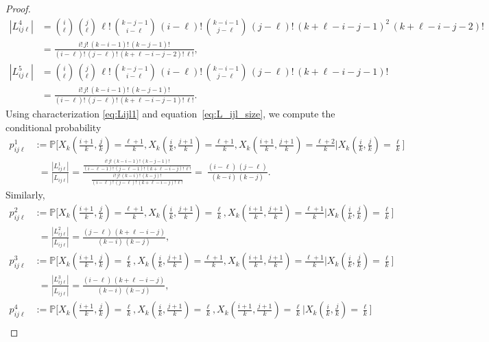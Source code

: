 \documentclass[12pt,a4paper]{amsart}
\theoremstyle{definition}
\newcommand{\PP}{\mathbb{P}}
\begin{document}
\begin{proof}
\begin{align*}
   |L_{ij\ell}^4| &= \binom{i}{\ell} \, \binom{j}{\ell} \, \ell! \, \binom{k-j-1}{i-\ell} \, (i-\ell)! \, \binom{k-i-1}{j-\ell} \, (j-\ell)! \,(k+\ell-i-j-1)^2 \,(k+\ell-i-j-2)! \\ 
   &= \frac{i! \, j! \, (k-i-1)! \, (k-j-1)!}{(i-\ell)! \, (j-\ell)! \, (k+\ell-i-j-2)! \, \ell!}, \\ 
   |L_{ij\ell}^5| &= \binom{i}{\ell} \, \binom{j}{\ell} \, \ell! \, \binom{k-j-1}{i-\ell} \, (i-\ell)! \, \binom{k-i-1}{j-\ell} \, (j-\ell)! \,(k+\ell-i-j-1)! \\ 
   &= \frac{i! \, j! \, (k-i-1)! \, (k-j-1)!}{(i-\ell)! \, (j-\ell)! \, (k+\ell-i-j-1)! \, \ell!}.
\end{align*}
Using characterization \eqref{eq:Lijl1} and equation~\eqref{eq:L_ijl_size}, we compute the conditional probability
\begin{align*}
   p_{ij\ell}^1 &:=\PP\big[X_k(\tfrac{i+1}{k},\tfrac{j}{k}) = \tfrac{\ell+1}{k},  X_k(\tfrac{i}{k},\tfrac{j+1}{k}) = \tfrac{\ell+1}{k},  X_k(\tfrac{i+1}{k},\tfrac{j+1}{k}) = \tfrac{\ell+2}{k} \big| X_k(\tfrac{i}{k},\tfrac{j}{k}) = \tfrac{\ell}{k}\big] \\
   & \phantom{:}= \frac{|L_{ij\ell}^1|}{|L_{ij\ell}|} = \frac{\frac{i! \, j! \, (k-i-1)! \, (k-j-1)!}{(i-\ell-1)! \, (j-\ell-1)! \, (k+\ell-i-j)! \, \ell!}}{\frac{i! \, j! \, (k-i)! \, (k-j)!}{(i-\ell)! \, (j-\ell)! \, (k+\ell-i-j)! \, \ell!}} =\  \frac{(i-\ell) \, (j-\ell)}{(k-i) \, (k-j)}.
\end{align*}
Similarly,
\begin{align*}
   p_{ij\ell}^2 &:=\PP\big[X_k(\tfrac{i+1}{k},\tfrac{j}{k}) = \tfrac{\ell+1}{k},  X_k(\tfrac{i}{k},\tfrac{j+1}{k}) = \tfrac{\ell}{k}, X_k(\tfrac{i+1}{k},\tfrac{j+1}{k}) = \tfrac{\ell+1}{k} \big| X_k(\tfrac{i}{k},\tfrac{j}{k}) = \tfrac{\ell}{k}\big] \\
   & \phantom{:}= \frac{|L_{ij\ell}^2|}{|L_{ij\ell}|} = \frac{(j-\ell) \, (k+\ell-i-j)}{(k-i) \, (k-j)} , \\
   p_{ij\ell}^3 &:=\PP\big[X_k(\tfrac{i+1}{k},\tfrac{j}{k}) = \tfrac{\ell}{k},  X_k(\tfrac{i}{k},\tfrac{j+1}{k}) = \tfrac{\ell+1}{k},  X_k(\tfrac{i+1}{k},\tfrac{j+1}{k}) = \tfrac{\ell+1}{k} \big| X_k(\tfrac{i}{k},\tfrac{j}{k}) = \tfrac{\ell}{k}\big] \\
   & \phantom{:}= \frac{|L_{ij\ell}^3|}{|L_{ij\ell}|} = \frac{(i-\ell) \, (k+\ell-i-j)}{(k-i) \, (k-j)} , \\
   p_{ij\ell}^4 &:=\PP\big[X_k(\tfrac{i+1}{k},\tfrac{j}{k}) = \tfrac{\ell}{k},  X_k(\tfrac{i}{k},\tfrac{j+1}{k}) = \tfrac{\ell}{k},  X_k(\tfrac{i+1}{k},\tfrac{j+1}{k}) = \tfrac{\ell}{k} \big| X_k(\tfrac{i}{k},\tfrac{j}{k}) = \tfrac{\ell}{k}\big] \\

\end{align*}
\end{proof}
\end{document}

